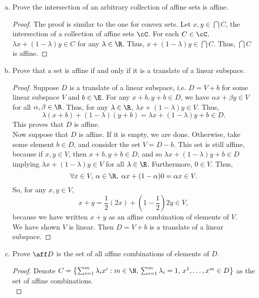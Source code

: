 \documentclass[12pt, letterpaper]{article}
\numberwithin{equation}{subsection}
\begin{document}
\begin{enumerate}[(a)]
\item Prove the intersection of an arbitrary collection of affine sets 
is affine.
\begin{proof}
The proof is similar to the one for convex sets. Let $x,y\in
\bigcap C$, the intersection of a collection of affine sets $\cC$. 
For each $C\in\cC$, $\lambda x+(1-\lambda)y\in C$ for any $\lambda\in\R$.
Thus, $x+(1-\lambda)y\in \bigcap C$. Thus, $\bigcap C$ is affine.
\end{proof}
\item Prove that a set is affine if and only if it is a translate of a 
linear subspace.
\begin{proof}
Suppose $D$ is a translate of a linear subspace, i.e. $D=V+b$ for 
some linear subspace $V$ and $b\in\E$. For any $x+b, y+b\in  D$, we have 
$\alpha x + \beta y \in V$ for all $\alpha,\beta\in\R$. Thus, 
for any $\lambda\in\R$, $\lambda x + (1-\lambda)y\in V$. Thus, 
\begin{equation*}
\lambda(x+b)+(1-\lambda)(y+b) = \lambda x + (1-\lambda)y + b 
\in D.
\end{equation*}
This proves that $D$ is affine. \\
Now suppose that $D$ is affine. If it is empty, we are done. 
Otherwise, take some element $b\in D$, and consider the set 
$V = D-b$. This set is still affine, because if $x, y\in V$, 
then $x+b,y+b\in D$, and so $\lambda x + (1-\lambda)y + b \in D$ 
implying $\lambda x + (1-\lambda)y \in V$ for all $\lambda\in\R$. 
Furthermore, $0\in V$. Thus, 
\begin{equation*}
\forall x \in V, \, \alpha\in \R,\; \alpha x + (1-\alpha)0
= \alpha x \in V.
\end{equation*}
So, for any $x,y\in V$, 
\begin{equation*}
x+y = \frac{1}{2}(2x) + \left(1-\frac{1}{2}\right)2y \in V,
\end{equation*}
because we have written $x+y$ as an affine combination of elements of 
$V$. \\
We have shown $V$ is linear. Then $D=V+b$ is a translate of a linear 
subspace.
\end{proof}
\item Prove $\aff D$ is the set of all affine combinations of elements 
of $D$. 
\begin{proof}
Denote $C = \left\{\sum_{i=1}^m \lambda_i x^i : m\in\N,\,
\sum_{i=1}^m \lambda_i=1,\, x^1,\ldots, x^m\in D\right\}$ as the set 
of affine combinations. \\

\end{proof}
\end{enumerate}
\end{document}
